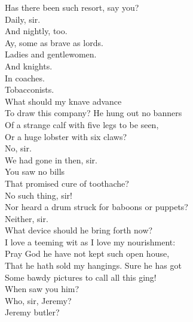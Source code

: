 \documentclass[a4paper,oneside,12pt]{memoir}
\begin{document}
\begin{drama*}
\lovewitspeaks Has there been such resort, say you?\\
\neighonespeaks {} Daily, sir.\\
\neightwospeaks And nightly, too.\\
\neighthreespeaks {} Ay, some as brave as lords.\\
\neighonespeaks Ladies and gentlewomen.\\
\neighthreespeaks {} And knights.\\
\neightwospeaks {} In coaches.\\
\neighonespeaks Tobacconists.\\
\lovewitspeaks {} What should my knave advance\\
To draw this company? He hung out no banners\\
Of a strange calf with five legs to be seen,\\
Or a huge lobster with six claws?\\
\neighthreespeaks {} No, sir.\\
\neightwospeaks We had gone in then, sir.\\
\lovewitspeaks {} You saw no bills\\
That promised cure of toothache?\\
\neightwospeaks {} No such thing, sir!\\
\lovewitspeaks Nor heard a drum struck for baboons or puppets?\\
\neighonespeaks Neither, sir.\\
\lovewitspeaks {} What device should he bring forth now?\\
I love a teeming wit as I love my nourishment:\\
Pray God he have not kept such open house,\\
That he hath sold my hangings. Sure he has got\\
Some bawdy pictures to call all this ging!\\
When saw you him?\\
\neighonespeaks {} Who, sir, Jeremy?\\
\neightwospeaks {} Jeremy butler?\\

\end{drama*}
\end{document}

